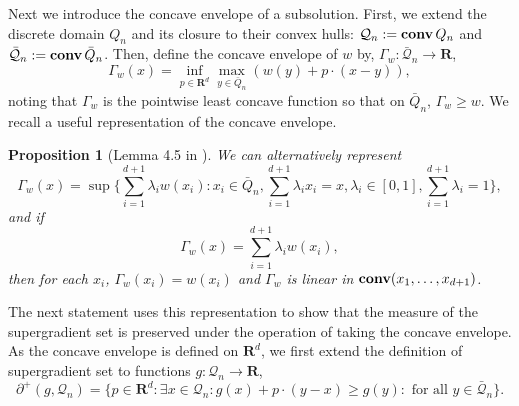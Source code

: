 \documentclass[12pt]{amsart}
\newcommand{\R}{\mathbf{R}}
\newcommand{\conv}{\mathop{\bf conv}}
\newcommand{\Co}{{\mathop {\bf Co}}} %
\newtheorem{prop}{Proposition}[section]
\begin{document}
Next we introduce the concave envelope of a subsolution. First, we extend the discrete domain $Q_n$ and its closure to their convex hulls: $\mathcal{Q}_n := \conv{Q_n}$ and
$\mathcal{\bar{Q}}_n := \conv{\bar{Q}}_n$. 
Then, define the concave envelope of $w$ by, $\Gamma_w:  \mathcal{\bar{Q}}_n \to \R$, 
\[
\Gamma_w(x) = \inf_{p \in \R^d} \max_{y \in \bar{Q}_n} \left( w(y) + p \cdot (x-y) \right), 
\]
noting that $\Gamma_w$ is the pointwise least concave function so that on $\bar{Q}_n$, $\Gamma_w \geq w$. We recall a useful representation
of the concave envelope. 


\begin{prop}[Lemma 4.5 in \cite{imbert2013introduction}] \label{prop:concave_rep}
We can alternatively represent
\[
\Gamma_w(x) = \sup\{ \sum_{i=1}^{d+1} \lambda_i w(x_i) : x_i \in  \bar{Q}_n, \sum_{i=1}^{d+1} \lambda_i x_i = x,  \lambda_i \in [0,1], \sum_{i=1}^{d+1} \lambda_i = 1\}, 
\]
and if 
\[
\Gamma_w(x) = \sum_{i=1}^{d+1} \lambda_i w(x_i) , 
\]
then for each $x_i$, $\Gamma_w(x_i) = w(x_i)$ and $\Gamma_w$ is linear in $\conv(x_1, \ldots, x_{d+1})$. 
\end{prop}

The next statement uses this representation to show that the measure of the supergradient set is preserved under the operation of taking the concave envelope. As the concave envelope is defined on $\R^d$, we first extend the definition of supergradient set
to functions $g: \mathcal{Q}_n \to \R$, 
\begin{equation}
\partial^+(g, \mathcal{Q}_n) = \{p \in \R^d: \exists x \in \mathcal{Q}_n : g(x) + p \cdot (y-x) \geq g(y) : \mbox{ for all $y \in \mathcal{\bar{Q}}_n$}\}.
\end{equation}
\end{document}
